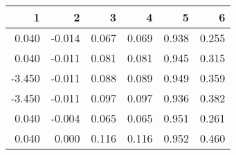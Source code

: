 \begin{table}[ht]
\centering
\begin{tabular}{rrrrrr}
  \hline
1 & 2 & 3 & 4 & 5 & 6 \\ 
  \hline
0.040 & -0.014 & 0.067 & 0.069 & 0.938 & 0.255 \\ 
  0.040 & -0.011 & 0.081 & 0.081 & 0.945 & 0.315 \\ 
  -3.450 & -0.011 & 0.088 & 0.089 & 0.949 & 0.359 \\ 
  -3.450 & -0.011 & 0.097 & 0.097 & 0.936 & 0.382 \\ 
  0.040 & -0.004 & 0.065 & 0.065 & 0.951 & 0.261 \\ 
  0.040 & 0.000 & 0.116 & 0.116 & 0.952 & 0.460 \\ 
   \hline
\end{tabular}
\end{table}
